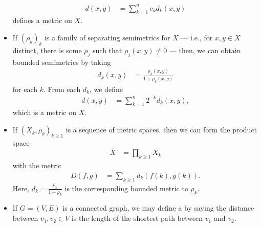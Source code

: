\begin{example}
\begin{itemize}
      \begin{align*}
        d\left(x,y\right) &= \sum_{k=1}^{n}c_kd_k\left(x,y\right)
      \end{align*}
      defines a metric on $X$.
    \item If $\left(\rho_k\right)_k$ is a family of separating semimetrics for $X$ --- i.e., for $x,y\in X$ distinct, there is some $\rho_{j}$ such that $\rho_j\left(x,y\right) \neq 0$ --- then, we can obtain bounded semimetrics by taking
      \begin{align*}
        d_k\left(x,y\right) &= \frac{\rho_k\left(x,y\right)}{1 + \rho_k\left(x,y\right)}
      \end{align*}
      for each $k$. From each $d_k$, we define
      \begin{align*}
        d\left(x,y\right) &= \sum_{k=1}^{n}2^{-k}d_k\left(x,y\right),
      \end{align*}
      which is a metric on $X$.
    \item If $\left(X_k,\rho_k\right)_{k\geq 1}$ is a sequence of metric spaces, then we can form the product space
      \begin{align*}
        X &= \prod_{k\geq 1}X_{k}
      \end{align*}
      with the metric
      \begin{align*}
        D\left(f,g\right) &= \sum_{k\geq 1}d_k\left(f(k),g(k)\right).
      \end{align*}
      Here, $d_k = \frac{\rho_k}{1 + \rho_k}$ is the corresponding bounded metric to $\rho_k$.
    \item If $G = \left( V,E \right)$ is a connected graph, we may define a by saying the distance between $v_1,v_2\in V$ is the length of the shortest path between $v_1$ and $v_2$.
  \end{itemize}
\end{example}
